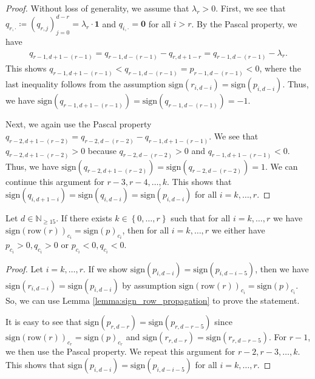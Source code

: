 \begin{proof}
    Without loss of generality, we assume that \( \lambda_r > 0 \).
    First, we see that \( q_{r, \cdot} \coloneqq (q_{r,j})_{j=0}^{d-r} = \lambda_r \cdot \mathbf{1} \) and \( q_{i,\cdot} =  \mathbf{0} \) for all \( i > r \). By the Pascal property, we have 
    \begin{align*}
        q_{r-1,d+1-(r-1)} = q_{r-1,d-(r-1)} - q_{r,d+1-r} = q_{r-1,d-(r-1)} - \lambda_r.
    \end{align*}
    This shows \( q_{r-1,d+1-(r-1)} < q_{r-1,d-(r-1)} = p_{r-1,d-(r-1)} < 0 \), where the last inequality follows from the assumption $\mathrm{sign}(r_{i,d-i}) = \mathrm{sign}(p_{i,d-i})$. Thus, we have \( \mathrm{sign}(q_{r-1,d+1-(r-1)}) = \mathrm{sign}(q_{r-1,d-(r-1)}) = \mathbf -1\). 
    
    Next, we again use the Pascal property \( q_{r-2,d+1-(r-2)} = q_{r-2,d-(r-2)} - q_{r-1,d+1-(r-1)} \). We see that \( q_{r-2,d+1-(r-2)} > 0 \) because \( q_{r-2,d-(r-2)} > 0 \) and \( q_{r-1,d+1-(r-1)} < 0 \). Thus, we have \( \mathrm{sign}(q_{r-2,d+1-(r-2)}) = \mathrm{sign}(q_{r-2,d-(r-2)}) = 1 \). We can continue this argument for \( r-3, r-4, \dots, k \). This shows that \( \mathrm{sign}(q_{i,d+1-i}) = \mathrm{sign}(q_{i,d-i}) = \mathrm{sign}(p_{i,d-i}) \) for all \( i = k, \dots, r\).
\end{proof}

\begin{lemma}\label{lemma:same_sign_propagation_easy}
    Let \( d \in \mathbb{N}_{\geq 15} \). If there exists \( k \in \left\{ 0, \dots, r \right\} \) such that for all \( i = k, \dots, r\) we have \(  \mathrm{sign}(\mathrm{row}(r))_{c_i} = \mathrm{sign}(p)_{c_i} \),
    then for all \( i = k, \dots, r\) we either have \( p_{c_i} > 0, q_{c_i} > 0 \) or \( p_{c_i} < 0, q_{c_i} < 0 \).
\end{lemma}
  
\begin{proof}
    Let \( i=k, \dots, r \). If we show \( \mathrm{sign}(p_{i,d-i}) = \mathrm{sign}(p_{i,d-i-5}) \), then we have $\mathrm{sign}(r_{i,d-i}) = \mathrm{sign}(p_{i,d-i})$ by assumption \( \mathrm{sign}(\mathrm{row}(r))_{c_i} = \mathrm{sign}(p)_{c_i} \). So, we can use Lemma \ref{lemma:sign_row_propagation} to prove the statement.

    It is easy to see that \( \mathrm{sign}(p_{r,d-r}) = \mathrm{sign}(p_{r,d-r-5}) \) since \( \mathrm{sign}(\mathrm{row}(r))_{c_r} = \mathrm{sign}(p)_{c_r} \) and \( \mathrm{sign}(r_{r,d-r}) = \mathrm{sign}(r_{r, d - r - 5}) \). For \( r - 1 \), we then use the Pascal property. We repeat this argument for \( r-2, r-3, \dots, k \). This shows that \( \mathrm{sign}(p_{i,d-i}) = \mathrm{sign}(p_{i,d-i-5}) \) for all \( i = k, \dots, r \).
\end{proof}

